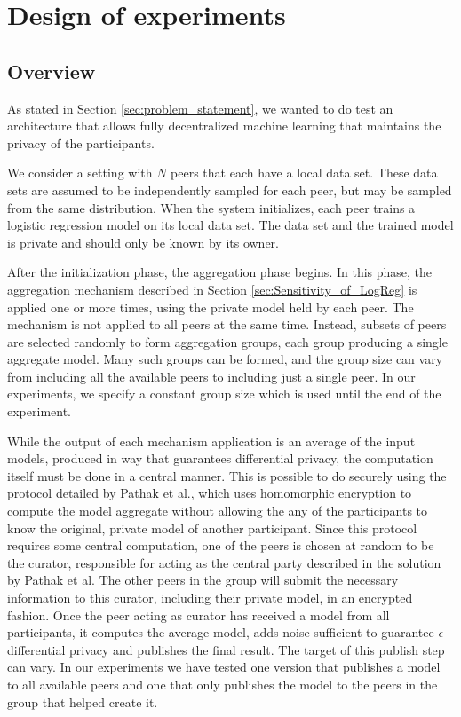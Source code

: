 \chapter{Design of experiments}

\section{Overview}
\label{sec:experiment_overview}
As stated in Section \ref{sec:problem_statement}, we wanted to do test an architecture that allows fully decentralized machine learning that maintains the privacy of the participants. 

We consider a setting with $N$ peers that each have a local data set. These data sets are assumed to be independently sampled for each peer, but may be sampled from the same distribution. When the system initializes, each peer trains a logistic regression model on its local data set. The data set and the trained model is private and should only be known by its owner.

After the initialization phase, the aggregation phase begins. In this phase, the aggregation mechanism described in Section \ref{sec:Sensitivity_of_LogReg} is applied one or more times, using the private model held by each peer. The mechanism is not applied to all peers at the same time. Instead, subsets of peers are selected randomly to form aggregation groups, each group producing a single aggregate model. Many such groups can be formed, and the group size can vary from including all the available peers to including just a single peer. In our experiments, we specify a constant group size which is used until the end of the experiment.

While the output of each mechanism application is an average of the input models, produced in way that guarantees differential privacy, the computation itself must be done in a central manner. This is possible to do securely using the protocol detailed by Pathak et al., which uses homomorphic encryption to compute the model aggregate without allowing the any of the participants to know the original, private model of another participant\citep{pathak2010diffprivhomo}. Since this protocol requires some central computation, one of the peers is chosen at random to be the curator, responsible for acting as the central party described in the solution by Pathak et al. The other peers in the group will submit the necessary information to this curator, including their private model, in an encrypted fashion. Once the peer acting as curator has received a model from all participants, it computes the average model, adds noise sufficient to guarantee $\epsilon$-differential privacy and publishes the final result. The target of this publish step can vary. In our experiments we have tested one version that publishes a model to all available peers and one that only publishes the model to the peers in the group that helped create it.

